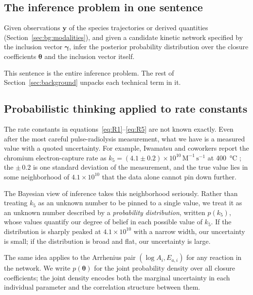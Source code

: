 \documentclass[12pt]{article}
\theoremstyle{plain}
\theoremstyle{definition}
\theoremstyle{remark}
\begin{document}
\subsection{The inference problem in one sentence}

Given observations $\mathbf{y}$ of the species trajectories or derived
quantities (Section~\ref{sec:bg:modalities}), and given a candidate kinetic
network specified by the inclusion vector $\boldsymbol\gamma$, infer the
posterior probability distribution over the closure coefficients
$\boldsymbol{\theta}$ and the inclusion vector itself.

This sentence is the entire inference problem.  The rest of
Section~\ref{sec:background} unpacks each technical term in it.

\subsection{Probabilistic thinking applied to rate constants}\label{sec:bg:prob}

The rate constants in equations~\eqref{eq:R1}--\eqref{eq:R5} are not known
exactly.  Even after the most careful pulse-radiolysis measurement, what we
have is a measured value with a quoted uncertainty.  For example, Iwamatsu and
coworkers report the chromium electron-capture rate as
$k_5 = (4.1\pm 0.2)\times 10^{10}\,\mathrm{M}^{-1}\,\mathrm{s}^{-1}$ at
\SI{400}{\celsius} \citep{Iwamatsu2026}; the $\pm\,0.2$ is one standard
deviation of the measurement, and the true value lies in some neighborhood of
$4.1\times 10^{10}$ that the data alone cannot pin down further.

The Bayesian view of inference takes this neighborhood seriously.  Rather than
treating $k_5$ as an unknown number to be pinned to a single value, we treat
it as an unknown number described by a \emph{probability distribution}, written
$p(k_5)$, whose values quantify our degree of belief in each possible value of
$k_5$.  If the distribution is sharply peaked at $4.1\times 10^{10}$ with a
narrow width, our uncertainty is small; if the distribution is broad and flat,
our uncertainty is large.

The same idea applies to the Arrhenius pair $(\log A_i, E_{a,i})$ for any
reaction in the network.  We write $p(\boldsymbol{\theta})$ for the joint
probability density over all closure coefficients; the joint density encodes
both the marginal uncertainty in each individual parameter and the correlation
structure between them.
\end{document}
